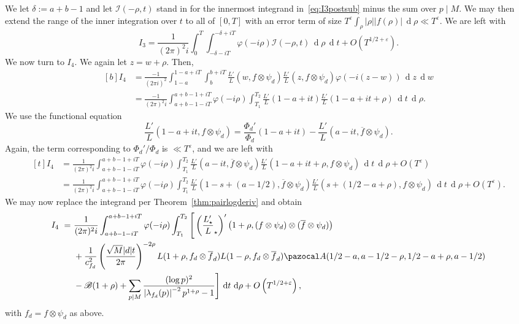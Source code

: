 \documentclass[11pt,reqno]{amsart} \usepackage{fullpage}
\newcommand{\vep}{\varepsilon}
\renewcommand{\d}[1]{\,\operatorname*{d}\!{#1}}
\newcommand\be{\begin{equation}}
\newcommand\ee{\end{equation}}
\newcommand{\gf}{\Phi_d}
\newcommand{\Lunram}{L_{\star}}
\numberwithin{equation}{section}
\begin{document}
We let $\delta:=a+b-1$ and let $\mathcal I(-\rho,t)$ stand in for the innermost integrand
in~\eqref{eq:I3postsub} minus the sum over $p\mid M$.
We may then extend the range of the inner integration over $t$ to all of $[0,T]$ with an
error term of size $T^\vep\int_\rho|\rho||f(\rho)|\d\rho\ll T^\vep$. We are left with
\be\label{eq:I3final}
I_3=\frac{1}{(2\pi)^2i}\int_0^T\int_{-\delta-iT}^{-\delta+iT}\varphi(-i\rho)
\mathcal I(-\rho,t)\d\rho\d t+O\left(T^{1/2+\vep}\right).\ee
We now turn to $I_4$. We again let $z=w+\rho$. Then,
\be\begin{aligned}[b]
  I_4&=
  \frac{-1}{(2\pi i)^2}\int_{1-a}^{1-a+iT}\int_b^{b+iT}
  \frac{L'}{L}(w,f\otimes\psi_d)\frac{L'}{L}(z,f\otimes\psi_d)\varphi(-i(z-w))\d z\d w \\
  &=\frac{-1}{(2\pi)^2i}\int_{a+b-1-iT}^{a+b-1+iT}\varphi(-i\rho)\int_{T_1}^{T_2}
  \frac{L'}{L}(1-a+it)\frac{L'}{L}(1-a+it+\rho)\d t\d\rho.
\end{aligned}\ee
We use the functional equation
\be\frac{L'}{L}(1-a+it,f\otimes\psi_d)
=\frac{\gf'}{\gf}(1-a+it)-\frac{L'}{L}(a-it,\overline f\otimes\psi_d).\ee
Again, the term corresponding to $\gf'/\gf$ is $\ll T^\vep$, and we are left with
\be\begin{aligned}[t]
  I_4&=\frac1{(2\pi)^2i}\int_{a+b-1-iT}^{a+b-1+iT}\varphi(-i\rho)\int_{T_1}^{T_2}
  \frac{L'}{L}(a-it,\overline f\otimes\psi_d)
  \frac{L'}{L}(1-a+it+\rho,f\otimes\psi_d)\d t\d\rho+O(T^\vep) \\
  &=\frac1{(2\pi)^2i}\int_{a+b-1-iT}^{a+b-1+iT}\varphi(-i\rho)\int_{T_1}^{T_2}
  \frac{L'}{L}(1-s+(a-1/2),\overline f\otimes\psi_d)
  \frac{L'}{L}(s+(1/2-a+\rho),f\otimes\psi_d)\d t\d\rho+O(T^\vep).
\end{aligned}\ee
We may now replace the integrand per Theorem~\ref{thm:pairlogderiv} and obtain
\be\begin{aligned}[b]
  I_4\ =\ &\frac1{(2\pi)^2i}\int_{a+b-1-iT}^{a+b-1+iT}\varphi(-i\rho)\int_{T_1}^{T_2}
  \Bigg[\left(\frac{\Lunram'}\Lunram\right)'
      \left(1+\rho,(f\otimes\psi_d)\otimes(\overline f\otimes\psi_d)\right) \\
  &+\frac{1}{c_{f_d}^2}
  \left(\frac{\sqrt M|d|t}{2\pi}\right)^{-2\rho}
  L(1+\rho,f_d\otimes\overline f_d)L(1-\rho,f_d\otimes\overline f_d)
  \pazocal A(1/2-a,a-1/2-\rho,1/2-a+\rho,a-1/2) \\
  &-\mathcal B(1+\rho)
  +\sum_{p\mid M}\frac{(\log p)^2}{\left|\lambda_{f_d}(p)\right|^{-2}p^{1+\rho}-1}\Bigg]
  \d t\d\rho+O\left(T^{1/2+\vep}\right),
\end{aligned}\ee
with $f_d=f\otimes\psi_d$ as above.
\end{document}
